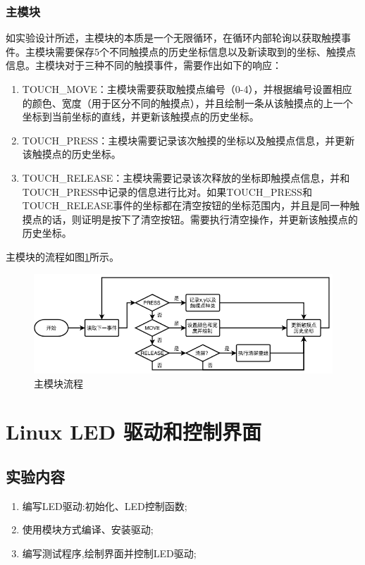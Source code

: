 \documentclass{report}
\begin{document}
\subsection{主模块}
\par 如实验设计所述，主模块的本质是一个无限循环，在循环内部轮询以获取触摸事件。主模块需要保存5个不同触摸点的历史坐标信息以及新读取到的坐标、触摸点信息。主模块对于三种不同的触摸事件，需要作出如下的响应：
\begin{enumerate}
    \item TOUCH\_MOVE：主模块需要获取触摸点编号（0-4），并根据编号设置相应的颜色、宽度（用于区分不同的触摸点），并且绘制一条从该触摸点的上一个坐标到当前坐标的直线，并更新该触摸点的历史坐标。
    \item TOUCH\_PRESS：主模块需要记录该次触摸的坐标以及触摸点信息，并更新该触摸点的历史坐标。
    \item TOUCH\_RELEASE：主模块需要记录该次释放的坐标即触摸点信息，并和TOUCH\_PRESS中记录的信息进行比对。如果TOUCH\_PRESS和TOUCH\_RELEASE事件的坐标都在清空按钮的坐标范围内，并且是同一种触摸点的话，则证明是按下了清空按钮。需要执行清空操作，并更新该触摸点的历史坐标。
\end{enumerate}
\par 主模块的流程如图\ref{fig:main}所示。
\begin{figure}[htpb]
    \centering
    \includegraphics[width=0.8\linewidth]{main.png}
    \caption{主模块流程}
    \label{fig:main}
\end{figure}

\chapter{Linux LED 驱动和控制界面}
\section{实验内容}

\begin{enumerate}
    \item 编写LED驱动:初始化、LED控制函数;
    \item 使用模块方式编译、安装驱动;
    \item 编写测试程序,绘制界面并控制LED驱动;
\end{enumerate}
\end{document}
